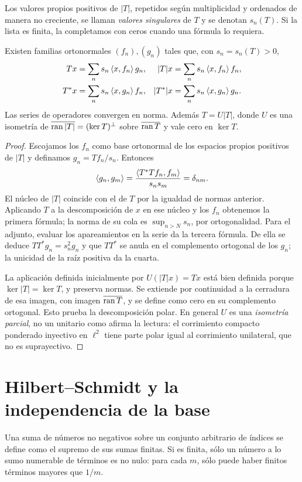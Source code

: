 \begin{definicion}
Los valores propios positivos de $|T|$, repetidos según multiplicidad y ordenados de manera no creciente, se llaman \emph{valores singulares} de $T$ y se denotan $s_n(T)$. Si la lista es finita, la completamos con ceros cuando una fórmula lo requiera.
\end{definicion}

\begin{teorema}\label{v3:singulares}
Existen familias ortonormales $(f_n),(g_n)$ tales que, con $s_n=s_n(T)>0$,
\begin{align*}
Tx&=\sum_ns_n\left\langle x,f_n\right\rangle g_n,& |T|x&=\sum_ns_n\left\langle x,f_n\right\rangle f_n,\\
T^*x&=\sum_ns_n\left\langle x,g_n\right\rangle f_n,& |T^*|x&=\sum_ns_n\left\langle x,g_n\right\rangle g_n.
\end{align*}
Las series de operadores convergen en norma. Además $T=U|T|$, donde $U$ es una isometría de $\overline{\operatorname{ran}|T|}=(\ker T)^\perp$ sobre $\overline{\operatorname{ran} T}$ y vale cero en $\ker T$.
\end{teorema}
\begin{proof}
Escojamos los $f_n$ como base ortonormal de los espacios propios positivos de $|T|$ y definamos $g_n=Tf_n/s_n$. Entonces
\[\left\langle g_n,g_m\right\rangle=\frac{\left\langle T^*Tf_n,f_m\right\rangle}{s_ns_m}=\delta_{nm}.
\]
El núcleo de $|T|$ coincide con el de $T$ por la igualdad de normas anterior. Aplicando $T$ a la descomposición de $x$ en ese núcleo y los $f_n$ obtenemos la primera fórmula; la norma de su cola es $\sup_{n>N}s_n$, por ortogonalidad. Para el adjunto, evaluar los apareamientos en la serie da la tercera fórmula. De ella se deduce $TT^*g_n=s_n^2g_n$ y que $TT^*$ se anula en el complemento ortogonal de los $g_n$; la unicidad de la raíz positiva da la cuarta.

La aplicación definida inicialmente por $U(|T|x)=Tx$ está bien definida porque $\ker|T|=\ker T$, y preserva normas. Se extiende por continuidad a la cerradura de esa imagen, con imagen $\overline{\operatorname{ran} T}$, y se define como cero en su complemento ortogonal. Esto prueba la descomposición polar. En general $U$ es una \emph{isometría parcial}, no un unitario como afirma la lectura: el corrimiento compacto ponderado inyectivo en $\ell^2$ tiene parte polar igual al corrimiento unilateral, que no es suprayectivo.
\end{proof}

\section{Hilbert--Schmidt y la independencia de la base}
Una suma de números no negativos sobre un conjunto arbitrario de índices se define como el supremo de sus sumas finitas. Si es finita, sólo un número a lo sumo numerable de términos es no nulo: para cada $m$, sólo puede haber finitos términos mayores que $1/m$.


